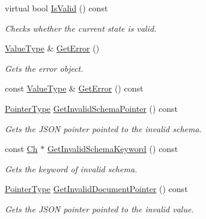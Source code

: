 \begin{DoxyCompactItemize}
virtual bool \mbox{\hyperlink{classrapidjson_1_1_generic_schema_validator_ad32a9ad31dbb588edaaf038ab053275b}{Is\+Valid}} () const
\begin{DoxyCompactList}\small\item\em Checks whether the current state is valid. \end{DoxyCompactList}\item 
\mbox{\hyperlink{classrapidjson_1_1_generic_schema_validator_a14216aea798d69f102987c1aae36e897}{Value\+Type}} \& \mbox{\hyperlink{classrapidjson_1_1_generic_schema_validator_a422c16457e512835b0d0f64ec1c81ba2}{Get\+Error}} ()
\begin{DoxyCompactList}\small\item\em Gets the error object. \end{DoxyCompactList}\item 
const \mbox{\hyperlink{classrapidjson_1_1_generic_schema_validator_a14216aea798d69f102987c1aae36e897}{Value\+Type}} \& \mbox{\hyperlink{classrapidjson_1_1_generic_schema_validator_aa6c2d3f031bbb29c88e3ac798897402e}{Get\+Error}} () const
\item 
\mbox{\hyperlink{classrapidjson_1_1_generic_schema_validator_aace9622f8ebac1c386081f6d1dcd774e}{Pointer\+Type}} \mbox{\hyperlink{classrapidjson_1_1_generic_schema_validator_a3238efb9d9144c2d6577362d8dc5f61b}{Get\+Invalid\+Schema\+Pointer}} () const
\begin{DoxyCompactList}\small\item\em Gets the J\+S\+ON pointer pointed to the invalid schema. \end{DoxyCompactList}\item 
const \mbox{\hyperlink{classrapidjson_1_1_generic_schema_validator_ab5b7093443e29cf66eb7cf47f3d8583d}{Ch}} $\ast$ \mbox{\hyperlink{classrapidjson_1_1_generic_schema_validator_a03bcd5497a574cffbd066d0aec2b5585}{Get\+Invalid\+Schema\+Keyword}} () const
\begin{DoxyCompactList}\small\item\em Gets the keyword of invalid schema. \end{DoxyCompactList}\item 
\mbox{\hyperlink{classrapidjson_1_1_generic_schema_validator_aace9622f8ebac1c386081f6d1dcd774e}{Pointer\+Type}} \mbox{\hyperlink{classrapidjson_1_1_generic_schema_validator_a60dfb4a89593c8d3ca4c89a6202feb52}{Get\+Invalid\+Document\+Pointer}} () const
\begin{DoxyCompactList}\small\item\em Gets the J\+S\+ON pointer pointed to the invalid value. \end{DoxyCompactList}\item 

\end{DoxyCompactItemize}

